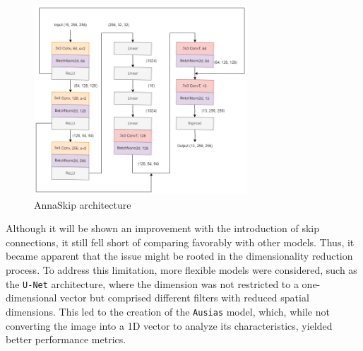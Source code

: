 \begin{figure}[H]
	\centering
	\includegraphics[width=8cm]{imgs/models/models/cnn/AnnaSkip.png}
	\caption{AnnaSkip architecture}
	\label{fig:residual-anna-skip}
\end{figure}
Although it will be shown an improvement with the introduction of skip connections, it still fell short of comparing favorably with other models. Thus, it became apparent that the issue might be rooted in the dimensionality reduction process. To address this limitation, more flexible models were considered, such as the \texttt{U-Net} architecture, where the dimension was not restricted to a one-dimensional vector but comprised different filters with reduced spatial dimensions. This led to the creation of the \texttt{Ausias} model, which, while not converting the image into a 1D vector to analyze its characteristics, yielded better performance metrics.
